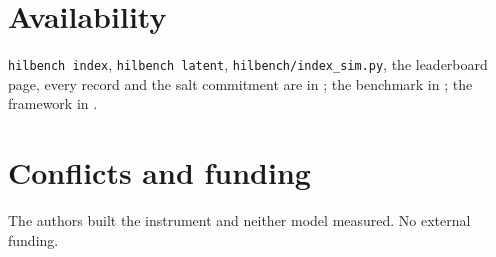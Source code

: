 \section*{Availability}
\texttt{hilbench index}, \texttt{hilbench latent}, \texttt{hilbench/index\_sim.py}, the leaderboard page, every record and the salt commitment are in \citet{yang2026hilbench}; the benchmark in \citet{yang2026hilbenchpaper}; the framework in \citet{yang2026unified}.

\section*{Conflicts and funding}
The authors built the instrument and neither model measured. No external funding.
